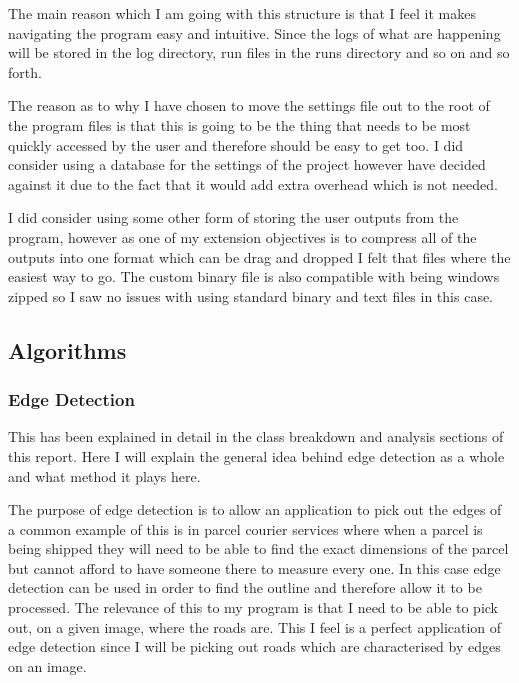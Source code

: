 \begin{FlushLeft}
    The main reason which I am going with this structure is that I feel it makes navigating the program easy and intuitive. Since the logs of what are happening will be stored in the log directory, run files in the runs directory and so on and so forth. \\ \bk

    The reason as to why I have chosen to move the settings file out to the root of the program files is that this is going to be the thing that needs to be most quickly accessed by the user and therefore should be easy to get too. I did consider using a database for the settings of the project however have decided against it due to the fact that it would add extra overhead which is not needed. \\ \bk

    I did consider using some other form of storing the user outputs from the program, however as one of my extension objectives is to compress all of the outputs into one format which can be drag and dropped I felt that files where the easiest way to go. The custom binary file is also compatible with being windows zipped so I saw no issues with using standard binary and text files in this case. \\ \bk

    \BK

    \subsection{Algorithms}

    \subsubsection{Edge Detection}
    This has been explained in detail in the class breakdown and analysis sections of this report. Here I will explain the general idea behind edge detection as a whole and what method it plays here. \\ \bk

    The purpose of edge detection is to allow an application to pick out the edges of a common example of this is in parcel courier services where when a parcel is being shipped they will need to be able to find the exact dimensions of the parcel but cannot afford to have someone there to measure every one. In this case edge detection can be used in order to find the outline and therefore allow it to be processed. The relevance of this to my program is that I need to be able to pick out, on a given image, where the roads are. This I feel is a perfect application of edge detection since I will be picking out roads which are characterised by edges on an image. \\ \bk


\end{FlushLeft}
